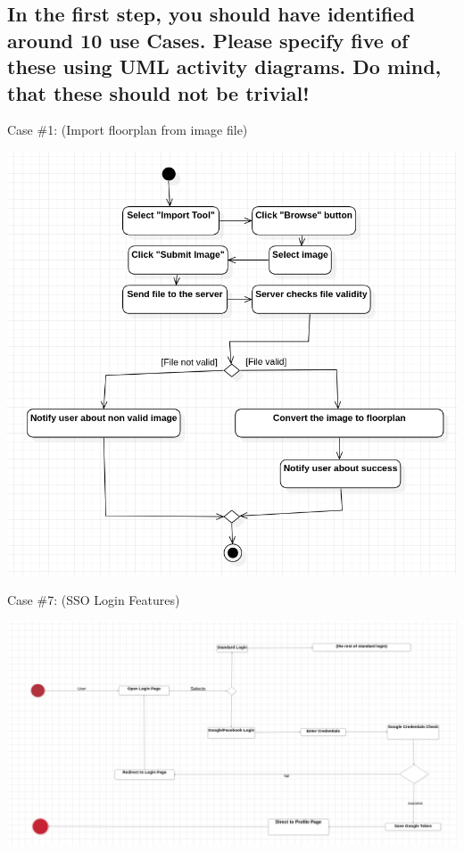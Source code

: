 		\clearpage
			
			
		\subsection{In the first step, you should have identified around 10 use Cases. Please specify
			five of these using UML activity diagrams. Do mind, that these should not be
			trivial!}
		
            \noindent Case \#1:
            (Import floorplan from image file)
            
            \includegraphics[width=\textwidth]{images/j_UseCase1.png}
        
			\noindent Case \#7:
			(SSO Login Features)
			
			\includegraphics[width=\textwidth]{images/sso.png}
		

